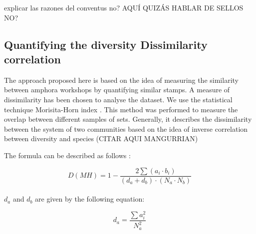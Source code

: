 \documentclass[review]{elsarticle}
\begin{document}
explicar las razones del conventus no?
AQUÍ QUIZÁS HABLAR DE SELLOS NO?




\subsection{Quantifying the diversity Dissimilarity correlation}


The approach proposed here is based on the idea of measuring the similarity between amphora workshops by quantifying similar stamps. A measure of dissimilarity has been chosen to analyse the dataset. We use the statistical technique Morisita-Horn index \citep{morisita_measuring_1959, horn_measurement_1966}. This method was performed to measure the overlap between different samples of sets. Generally, it describes the dissimilarity between the system of two communities based on the idea of inverse correlation between diversity and species (CITAR AQUI MANGURRIAN)

The formula can be described as follows \citep{magurran_measuring_2013}:

\begin{equation}
D(MH) = 1- \frac{2 \sum(a_{i} \cdot b_{i})}{(d_{a} + d_{b}) \cdot (N_{a} \cdot N_{b})}
\end{equation} \\

$d_{a}$ and $d_{b}$ are given by the following equation:

\begin{equation}
d_{a} = \frac{\sum a_{i}^{2}}{N_{a}^{2}} 
\end{equation} \\
\end{document}
